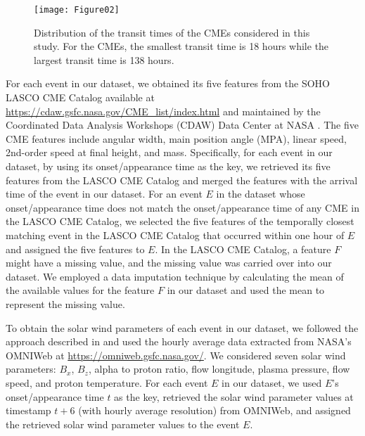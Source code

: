 \documentclass{article}
\begin{document}
\begin{figure}
\begin{center}
\texttt{[image: Figure02]}
\end{center}
\caption{Distribution of the 
transit times of the CMEs considered in this study.
For the CMEs, the smallest transit time is 18 hours 
while the largest transit time is 138 hours.}
\label{fig:eventsDistrub}
\end{figure}

For each event in our dataset, we obtained its five features from 
the SOHO LASCO CME Catalog 
available at \url{https://cdaw.gsfc.nasa.gov/CME_list/index.html}
and
maintained by
the Coordinated Data Analysis Workshops (CDAW) Data Center at NASA \citep{2009EM&P..104..295G}. 
The five CME features include 
angular width, 
main position angle (MPA), 
linear speed, 
2nd-order speed at final height, 
and mass. 
Specifically, for each event in our dataset,
by using its onset/appearance time as the key, 
we retrieved its five features from 
the LASCO CME Catalog
and merged the features with the arrival time
of the event in our dataset.
For an event $E$ in the dataset whose onset/appearance time does not match 
the onset/appearance time of any CME in the LASCO CME Catalog, 
we selected the five features of the temporally closest matching event in the LASCO CME Catalog that occurred within one hour of $E$ and assigned the five
features to $E$. 
In the LASCO CME Catalog, 
a feature $F$ might have a missing value, and the
missing value was carried over into our dataset.
We employed a data imputation technique by calculating the mean of the available values for the feature $F$
in our dataset
and used the mean to represent the missing value.

To obtain the solar wind parameters of each event in our dataset, 
we followed the approach described in \citet{2018ApJ...855..109L} 
and used the hourly average data extracted from NASA's OMNIWeb at \url{https://omniweb.gsfc.nasa.gov/}. 
We considered seven solar wind parameters:
$B_{x}$, 
$B_{z}$, 
alpha to proton ratio, 
flow longitude, 
plasma pressure, 
flow speed, 
and proton temperature. 
For each event $E$ in our dataset, 
we used $E$'s onset/appearance time $t$ as the key,
retrieved the solar wind parameter values at timestamp $t + 6$
(with hourly average resolution) 
from OMNIWeb,
and assigned the retrieved solar wind parameter values to the 
event $E$.
\end{document}
